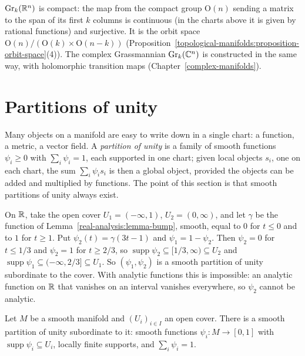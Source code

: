 \begin{remark}\label{smooth-manifolds:remark-grassmannian}
$\mathrm{Gr}_k(\mathbb{R}^n)$ is compact: the map from the compact group $\mathrm{O}(n)$ sending a matrix to the span of its first $k$ columns is continuous (in the charts above it is given by rational functions) and surjective. It is the
orbit space $\mathrm{O}(n)/(\mathrm{O}(k) \times \mathrm{O}(n - k))$ (Proposition~\ref{topological-manifolds:proposition-orbit-space}(4)). The complex Grassmannian $\mathrm{Gr}_k(\mathbb{C}^n)$ is constructed in the same way, with
holomorphic transition maps (Chapter~\ref{complex-manifolds}).
\end{remark}

\section{Partitions of unity}\label{smooth-manifolds:section-partitions}

Many objects on a manifold are easy to write down in a single chart: a function, a metric, a vector field. A \emph{partition of unity} is a family of smooth
functions $\psi_i \geq 0$ with $\sum_i\psi_i = 1$, each supported in one chart; given local objects $s_i$, one on each chart, the sum $\sum_i\psi_is_i$ is then a
global object, provided the objects can be added and multiplied by functions. The point of this section is that smooth partitions of unity always exist.

\begin{example}\label{smooth-manifolds:example-partition-line}
On $\mathbb{R}$, take the open cover $U_1 = (-\infty, 1)$, $U_2 = (0, \infty)$, and let $\gamma$ be the function of Lemma~\ref{real-analysis:lemma-bump}, smooth,
equal to $0$ for $t \leq 0$ and to $1$ for $t \geq 1$. Put $\psi_2(t) = \gamma(3t - 1)$ and $\psi_1 = 1 - \psi_2$. Then $\psi_2 = 0$ for $t \leq 1/3$ and
$\psi_2 = 1$ for $t \geq 2/3$, so $\operatorname{supp}\psi_2 \subseteq [1/3, \infty) \subseteq U_2$ and $\operatorname{supp}\psi_1 \subseteq (-\infty, 2/3]
\subseteq U_1$. So $(\psi_1, \psi_2)$ is a smooth partition of unity subordinate to the cover. With analytic functions this is impossible: an analytic
function on $\mathbb{R}$ that vanishes on an interval vanishes everywhere, so $\psi_2$ cannot be analytic.
\end{example}

\begin{theorem}\label{smooth-manifolds:theorem-partitions-of-unity}
Let $M$ be a smooth manifold and $(U_i)_{i \in I}$ an open cover. There is a smooth partition of unity subordinate to it: smooth functions $\psi_i \colon M \to [0, 1]$ with
$\operatorname{supp}\psi_i \subseteq U_i$, locally finite supports, and $\sum_i\psi_i = 1$.
\end{theorem}

